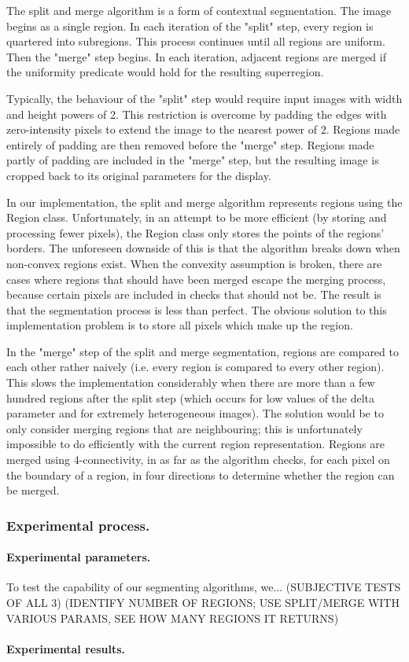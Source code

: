 The split and merge algorithm is a form of contextual segmentation. The image begins as a single region. In each iteration of the "split" step, every region is quartered into subregions. This process continues until all regions are uniform. Then the "merge" step begins. In each iteration, adjacent regions are merged if the uniformity predicate would hold for the resulting superregion.

Typically, the behaviour of the "split" step would require input images with width and height powers of 2. This restriction is overcome by padding the edges with zero-intensity pixels to extend the image to the nearest power of 2. Regions made entirely of padding are then removed before the "merge" step. Regions made partly of padding are included in the "merge" step, but the resulting image is cropped back to its original parameters for the display.

In our implementation, the split and merge algorithm represents regions using the Region class. Unfortunately, in an attempt to be more efficient (by storing and processing fewer pixels), the Region class only stores the points of the regions' borders. The unforeseen downside of this is that the algorithm breaks down when non-convex regions exist. When the convexity assumption is broken, there are cases where regions that should have been merged escape the merging process, because certain pixels are included in checks that should not be. The result is that the segmentation process is less than perfect. The obvious solution to this implementation problem is to store all pixels which make up the region.

In the "merge" step of the split and merge segmentation, regions are compared to each other rather naively (i.e. every region is compared to every other region). This slows the implementation considerably when there are more than a few hundred regions after the split step (which occurs for low values of the delta parameter and for extremely heterogeneous images). The solution would be to only consider merging regions that are neighbouring; this is unfortunately impossible to do efficiently with the current region representation. Regions are merged using 4-connectivity, in as far as the algorithm checks, for each pixel on the boundary of a region, in four directions to determine whether the region can be merged.

\subsubsection{Experimental process.}

\paragraph{Experimental parameters.}
To test the capability of our segmenting algorithms, we...
(SUBJECTIVE TESTS OF ALL 3)
(IDENTIFY NUMBER OF REGIONS; USE SPLIT/MERGE WITH VARIOUS PARAMS, SEE HOW MANY REGIONS IT RETURNS)

\paragraph{Experimental results.}





